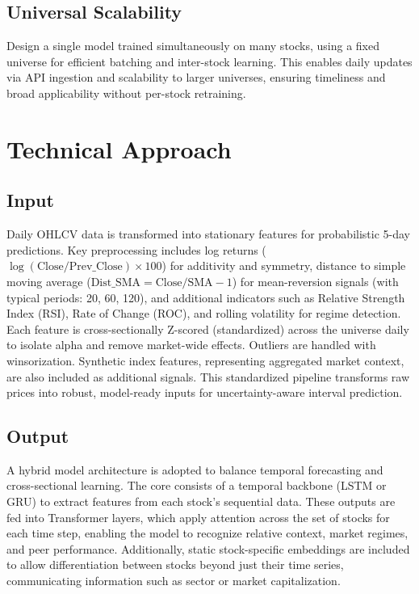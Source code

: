\documentclass[twoside,final]{hcmut-report}
\begin{document}
\subsection{Universal Scalability}
Design a single model trained simultaneously on many stocks, using a fixed universe for efficient batching and inter-stock learning. This enables daily updates via API ingestion and scalability to larger universes, ensuring timeliness and broad applicability without per-stock retraining.

\section{Technical Approach}
\subsection{Input}
Daily OHLCV data is transformed into stationary features for probabilistic 5-day predictions. Key preprocessing includes log returns ($\log(\mathrm{Close}/\mathrm{Prev\_Close}) \times 100$) for additivity and symmetry, distance to simple moving average ($\mathrm{Dist\_SMA} = \mathrm{Close}/\mathrm{SMA} - 1$) for mean-reversion signals (with typical periods: 20, 60, 120), and additional indicators such as Relative Strength Index (RSI), Rate of Change (ROC), and rolling volatility for regime detection.\\

Each feature is cross-sectionally Z-scored (standardized) across the universe daily to isolate alpha and remove market-wide effects. Outliers are handled with winsorization. Synthetic index features, representing aggregated market context, are also included as additional signals. This standardized pipeline transforms raw prices into robust, model-ready inputs for uncertainty-aware interval prediction.

\subsection{Output}
A hybrid model architecture is adopted to balance temporal forecasting and cross-sectional learning. The core consists of a temporal backbone (LSTM or GRU) to extract features from each stock’s sequential data. These outputs are fed into Transformer layers, which apply attention across the set of stocks for each time step, enabling the model to recognize relative context, market regimes, and peer performance. Additionally, static stock-specific embeddings are included to allow differentiation between stocks beyond just their time series, communicating information such as sector or market capitalization.\\
\end{document}
